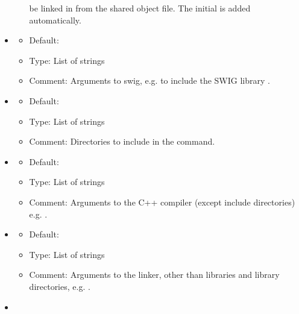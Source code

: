 \begin{itemize}
\begin{itemize}
      be linked in from the shared object file. The initial  is added
      automatically.
  \end{itemize}
\item {}
  \begin{itemize}
    \item Default: 
    \item Type: List of strings
    \item Comment: Arguments to swig, e.g. \emp{['-lpointers.i']}
      to include the SWIG library .
  \end{itemize}
\item {}
  \begin{itemize}
    \item Default: \emp{[]}
    \item Type: List of strings
    \item Comment: Directories to include in the  command.
  \end{itemize}
\item {}
  \begin{itemize}
    \item Default: \emp{['-O2']}
    \item Type: List of strings
    \item Comment: Arguments to the C++ compiler (except include
      directories) e.g. .
  \end{itemize}
\item {}
  \begin{itemize}
    \item Default: \emp{[]}
    \item Type: List of strings
    \item Comment: Arguments to the linker, other than libraries and library
      directories, e.g. \emp{['-E', '-U']}.
  \end{itemize}
\item {}
  \begin{itemize}

\end{itemize}
\end{itemize}
